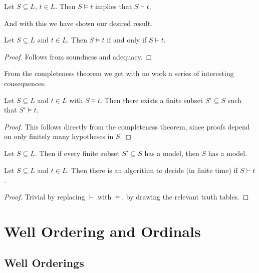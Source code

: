 \documentclass[a4paper]{scrartcl}
\begin{document}
\begin{corollary}[Adequacy]
  Let $S \subseteq L$, $t \in L$. Then $S \models t$ implies that $S \vdash t$. 
\end{corollary}

And with this we have shown our desired result.

\begin{theorem}
  Let $S \subseteq L$ and $t \in L$. Then $S \models t$ if and only if $S \vdash t$.
\end{theorem}
\begin{proof}
  Follows from soundness and adequacy.
\end{proof}

From the completeness theorem we get with no work a series of interesting consequences.

\begin{theorem}
  Let $S \subseteq L$ and $t \in L$ with $S \models t$. Then there exists a finite subset $S' \subseteq S$ such that $S' \models t$.
\end{theorem}
\begin{proof}
  This follows directly from the completeness theorem, since proofs depend on only finitely many hypotheses in $S$.
\end{proof}

\begin{corollary}
  Let $S \subseteq L$. Then if every finite subset $S' \subseteq S$ has a model, then $S$ has a model. 
\end{corollary}

\begin{theorem}[Decidability]
  Let $S \subseteq L$ and $t \in L$. Then there is an algorithm to decide (in finite time) if $S \vdash t$.
\end{theorem}
\begin{proof}
  Trivial by replacing $\vdash$ with $\models$, by drawing the relevant truth tables.
\end{proof}


\section{Well Ordering and Ordinals}

\subsection{Well Orderings}
\end{document}
